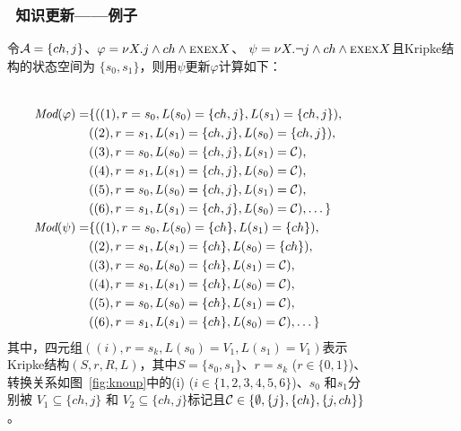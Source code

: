 \documentclass[9pt, CJK]{beamer}
\begin{document}
\begin{frame}
	\frametitle{~知识更新——{\footnotesize 例子}}
	{\tiny
		\begin{example}
			令${\cal A}=\{ch, j\}$、$\varphi = \nu X. j \wedge ch \wedge \textsc{e} \textsc{x} \textsc{e} \textsc{x} X$、 $\psi= \nu X. \neg j \wedge ch \wedge \textsc{e} \textsc{x} \textsc{e} \textsc{x} X$且Kripke结构的状态空间为 $\{s_0,s_1\}$，则用$\psi$更新$\varphi$计算如下：
			\begin{columns}
				\begin{align*}
					\textit{Mod}(\varphi) = & \{((1), r=s_0, L(s_0)=\{ch,j\}, L(s_1)=\{ch,j\}), \\
					& ((2),  r=s_1, L(s_1)=\{ch,j\}, L(s_0)=\{ch,j\}),\\
					& ((3),  r=s_0, L(s_0)=\{ch,j\}, L(s_1)={\cal C}), \\
					& ((4),  r=s_1, L(s_1)=\{ch,j\}, L(s_0)={\cal C}), \\
					& ((5),  r=s_0, L(s_0)=\{ch,j\}, L(s_1)={\cal C}), \\
					& ((6),  r=s_1, L(s_1)=\{ch,j\}, L(s_0)={\cal C}), \dots\}\\
					\textit{Mod}(\psi) = & \{((1), r=s_0, L(s_0)=\{ch\}, L(s_1)=\{ch\}),\\
					& ((2), r=s_1, L(s_1)=\{ch\}, L(s_0)=\{ch\}),\\
					& ((3), r=s_0, L(s_0)=\{ch\}, L(s_1)={\cal C}),\\
					& ((4), r=s_1, L(s_1)=\{ch\}, L(s_0)={\cal C}), \\
					& ((5), r=s_0, L(s_0)=\{ch\}, L(s_1)={\cal C}),\\
					& ((6), r=s_1, L(s_1)=\{ch\}, L(s_0)={\cal C}), \dots\}
				\end{align*}
				其中，四元组$((i), r= s_k, L(s_0)=V_1, L(s_1)=V_1)$表示Kripke结构$(S,r,R,L)$，其中$S=\{s_0, s_1\}$、$r=s_k$ ($r\in \{0,1\}$)、转换关系如图~\ref{fig:knoup}中的(i) ($i \in \{1,2,3,4,5,6\}$)、$s_0$ 和$s_1$分别被 $V_1 \subseteq \{ch,j\}$ 和 $V_2\subseteq \{ch,j\}$标记且${\cal C} \in \{\emptyset, \{j\}, \{ch\}, \{j,ch\}\}$。
				\begin{figure}
					\centering
\end{figure}
\end{columns}
\end{example}}
\end{frame}
\end{document}
